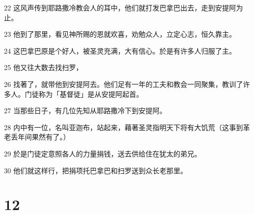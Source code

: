\par 22 这风声传到耶路撒冷教会人的耳中，他们就打发巴拿巴出去，走到安提阿为止。
\par 23 他到了那里，看见神所赐的恩就欢喜，劝勉众人，立定心志，恒久靠主。
\par 24 这巴拿巴原是个好人，被圣灵充满，大有信心。於是有许多人归服了主。
\par 25 他又往大数去找扫罗，
\par 26 找著了，就带他到安提阿去。他们足有一年的工夫和教会一同聚集，教训了许多人。门徒称为「基督徒」是从安提阿起首。
\par 27 当那些日子，有几位先知从耶路撒冷下到安提阿。
\par 28 内中有一位，名叫亚迦布，站起来，藉著圣灵指明天下将有大饥荒（这事到革老丢年间果然有了。）
\par 29 於是门徒定意照各人的力量捐钱，送去供给住在犹太的弟兄。
\par 30 他们就这样行，把捐项托巴拿巴和扫罗送到众长老那里。

\chapter{12}

